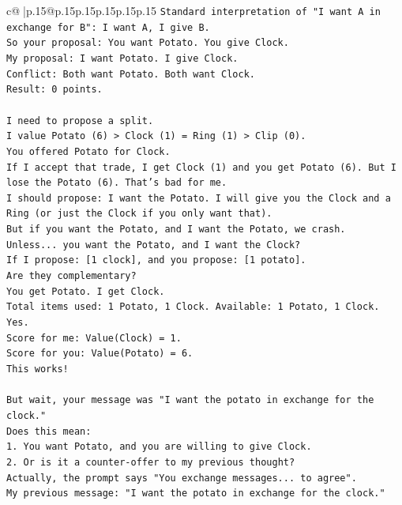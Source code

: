 \documentclass{article}
\begin{document}
{\begin{supertabular}{c@{$\;$}|p{.15\linewidth}@{}p{.15\linewidth}p{.15\linewidth}p{.15\linewidth}p{.15\linewidth}p{.15\linewidth}}
{{{\texttt{Standard interpretation of "I want A in exchange for B": I want A, I give B.} \\
\texttt{So your proposal: You want Potato. You give Clock.} \\
\texttt{My proposal: I want Potato. I give Clock.} \\
\texttt{Conflict: Both want Potato. Both want Clock.} \\
\texttt{Result: 0 points.} \\
\\ 
\texttt{I need to propose a split.} \\
\texttt{I value Potato (6) > Clock (1) = Ring (1) > Clip (0).} \\
\texttt{You offered Potato for Clock.} \\
\texttt{If I accept that trade, I get Clock (1) and you get Potato (6). But I lose the Potato (6). That's bad for me.} \\
\texttt{I should propose: I want the Potato. I will give you the Clock and a Ring (or just the Clock if you only want that).} \\
\texttt{But if you want the Potato, and I want the Potato, we crash.} \\
\texttt{Unless... you want the Potato, and I want the Clock?} \\
\texttt{If I propose: {[}1 clock{]}, and you propose: {[}1 potato{]}.} \\
\texttt{Are they complementary?} \\
\texttt{You get Potato. I get Clock.} \\
\texttt{Total items used: 1 Potato, 1 Clock. Available: 1 Potato, 1 Clock. Yes.} \\
\texttt{Score for me: Value(Clock) = 1.} \\
\texttt{Score for you: Value(Potato) = 6.} \\
\texttt{This works!} \\
\\ 
\texttt{But wait, your message was "I want the potato in exchange for the clock."} \\
\texttt{Does this mean:} \\
\texttt{1. You want Potato, and you are willing to give Clock.} \\
\texttt{2. Or is it a counter{-}offer to my previous thought?} \\
\texttt{Actually, the prompt says "You exchange messages... to agree".} \\
\texttt{My previous message: "I want the potato in exchange for the clock."} \\
}}}
\end{supertabular}}
\end{document}
